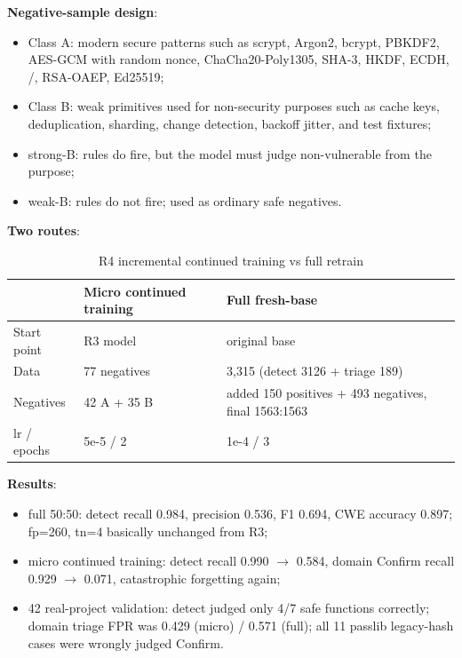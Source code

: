 \documentclass[11pt]{article}
\newcommand{\code}[1]{\texttt{\detokenize{#1}}}
\begin{document}
\textbf{Negative-sample design}:

\begin{itemize}
  \item Class A: modern secure patterns such as scrypt, Argon2, bcrypt, PBKDF2, AES-GCM with random nonce,
        ChaCha20-Poly1305, SHA-3, HKDF, ECDH, \code{secrets}/\code{os.urandom}, RSA-OAEP, Ed25519;
  \item Class B: weak primitives used for non-security purposes such as cache keys, deduplication, sharding,
        change detection, backoff jitter, and test fixtures;
  \item strong-B: rules do fire, but the model must judge non-vulnerable from the purpose;
  \item weak-B: rules do not fire; used as ordinary safe negatives.
\end{itemize}

\textbf{Two routes}:

\begin{table}[h]
\centering
\caption{R4 incremental continued training vs full retrain}
\label{tab:r4-routes-en}
\small
\begin{tabularx}{\linewidth}{L{2.4cm}Y Y}
\toprule
 & \textbf{Micro continued training} & \textbf{Full fresh-base} \\
\midrule
Start point & R3 model & original base \\
Data & 77 negatives & 3,315 (detect 3126 + triage 189) \\
Negatives & 42 A + 35 B & added 150 positives + 493 negatives, final 1563:1563 \\
lr / epochs & 5e-5 / 2 & 1e-4 / 3 \\
\bottomrule
\end{tabularx}
\end{table}

\textbf{Results}:

\begin{itemize}
  \item full 50:50: detect recall 0.984, precision 0.536, F1 0.694, CWE accuracy 0.897; fp=260, tn=4 basically
        unchanged from R3;
  \item micro continued training: detect recall 0.990 $\rightarrow$ 0.584, domain Confirm recall 0.929
        $\rightarrow$ 0.071, catastrophic forgetting again;
  \item 42 real-project validation: detect judged only 4/7 safe functions correctly; domain triage FPR was
        0.429 (micro) / 0.571 (full); all 11 passlib legacy-hash cases were wrongly judged Confirm.
\end{itemize}
\end{document}
